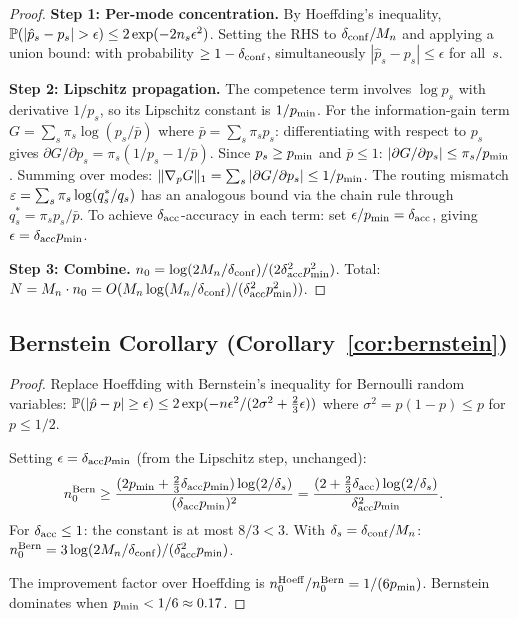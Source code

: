 \begin{proof}
\noindent\textbf{Step 1: Per-mode concentration.}
By Hoeffding's inequality, $\mathbb{P}(|\hat{p}_s - p_s| > \epsilon) \le 2\exp(-2n_s\epsilon^2)$.
Setting the RHS to $\delta_{\mathrm{conf}}/M_n$ and applying a union bound: with probability $\ge 1-\delta_{\mathrm{conf}}$, simultaneously $|\hat{p}_s - p_s| \le \epsilon$ for all~$s$.

\noindent\textbf{Step 2: Lipschitz propagation.}
The competence term involves $\log p_s$ with derivative $1/p_s$, so its Lipschitz constant is $1/p_{\min}$.
For the information-gain term $G = \sum_s \pi_s \log(p_s / \bar{p})$ where $\bar{p} = \sum_s \pi_s p_s$: differentiating with respect to $p_s$ gives $\partial G / \partial p_s = \pi_s(1/p_s - 1/\bar{p})$.
Since $p_s \ge p_{\min}$ and $\bar{p} \le 1$: $|\partial G / \partial p_s| \le \pi_s / p_{\min}$.
Summing over modes: $\|\nabla_p G\|_1 = \sum_s |\partial G / \partial p_s| \le 1/p_{\min}$.
The routing mismatch $\varepsilon = \sum_s \pi_s \log(q_s^*/q_s)$ has an analogous bound via the chain rule through $q_s^* = \pi_s p_s / \bar{p}$.
To achieve $\delta_{\mathrm{acc}}$-accuracy in each term: set $\epsilon/p_{\min} = \delta_{\mathrm{acc}}$, giving $\epsilon = \delta_{\mathrm{acc}}p_{\min}$.

\noindent\textbf{Step 3: Combine.}
$n_0 = \log(2M_n/\delta_{\mathrm{conf}}) / (2\delta_{\mathrm{acc}}^2p_{\min}^2)$.
Total: $N = M_n \cdot n_0 = O(M_n\log(M_n/\delta_{\mathrm{conf}})/(\delta_{\mathrm{acc}}^2p_{\min}^2))$.
\end{proof}

\subsection{Bernstein Corollary (Corollary~\ref{cor:bernstein})}
\label{app:bernstein}

\begin{proof}
Replace Hoeffding with Bernstein's inequality for Bernoulli random variables:
$\mathbb{P}(|\hat{p} - p| \ge \epsilon) \le 2\exp(-n\epsilon^2 / (2\sigma^2 + \frac{2}{3}\epsilon))$
where $\sigma^2 = p(1-p) \le p$ for $p \le 1/2$.

Setting $\epsilon = \delta_{\mathrm{acc}}p_{\min}$ (from the Lipschitz step, unchanged):
\begin{align}
  n_0^{\mathrm{Bern}} &\ge \frac{(2p_{\min} + \frac{2}{3}\delta_{\mathrm{acc}}p_{\min})\log(2/\delta_s)}{(\delta_{\mathrm{acc}}p_{\min})^2}
  = \frac{(2 + \frac{2}{3}\delta_{\mathrm{acc}})\log(2/\delta_s)}{\delta_{\mathrm{acc}}^2p_{\min}}.
\end{align}
For $\delta_{\mathrm{acc}} \le 1$: the constant is at most $8/3 < 3$.
With $\delta_s = \delta_{\mathrm{conf}}/M_n$:
$n_0^{\mathrm{Bern}} = 3\log(2M_n/\delta_{\mathrm{conf}})/(\delta_{\mathrm{acc}}^2p_{\min})$.

The improvement factor over Hoeffding is $n_0^{\mathrm{Hoeff}}/n_0^{\mathrm{Bern}} = 1/(6p_{\min})$.
Bernstein dominates when $p_{\min} < 1/6 \approx 0.17$.
\end{proof}


